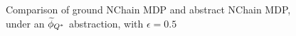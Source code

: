 \begin{figure}[h]
\label{fig:nchain-visual}
\caption{Comparison of ground NChain \ac{MDP} and abstract NChain \ac{MDP}, under an $\widetilde \phi_{Q^*}$ abstraction, with $\epsilon=0.5$}
\end{figure} 

%
%

